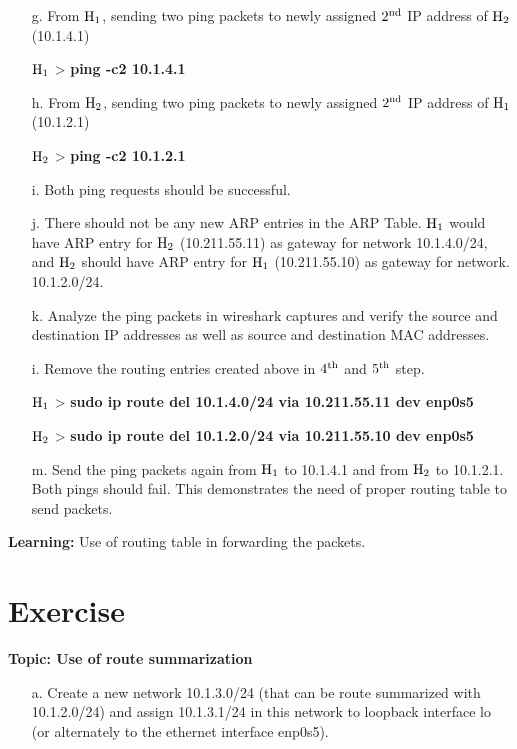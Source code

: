 \begin{multicols}{2}
\begin{itemize}
\item[g.] From ${\rm H}_{1}$, sending two ping packets to newly assigned $2^{\rm nd}$ IP address of ${\rm H}_{2}$ (10.1.4.1)

${\rm H}_{1}$ > \textbf{ping -c2 10.1.4.1}


\item[h.] From ${\rm H}_{2}$, sending two ping packets to newly assigned $2^{\rm nd}$ IP address of ${\rm H}_{1}$ (10.1.2.1)

${\rm H}_{2}$ > \textbf{ping -c2 10.1.2.1}

\item[i.] Both ping requests should be successful.

\item[j.] There should not be any new ARP entries in the ARP Table. ${\rm H}_{1}$ would have ARP entry for ${\rm H}_{2}$ (10.211.55.11) as gateway for network 10.1.4.0/24, and ${\rm H}_{2}$ should have ARP entry for ${\rm H}_{1}$ (10.211.55.10) as gateway for network. 10.1.2.0/24.


\item[k.] Analyze the ping packets in wireshark captures and verify the source and destination IP addresses as well as source and destination MAC addresses.

\item[i.] Remove the routing entries created above in $4^{\rm th}$ and $5^{\rm th}$ step.

${\rm H}_{1}$ > \textbf{sudo ip route del 10.1.4.0/24 via 10.211.55.11 dev enp0s5}

${\rm H}_{2}$ > \textbf{sudo ip route del 10.1.2.0/24 via 10.211.55.10 dev enp0s5}

\item[m.] Send the ping packets again from ${\rm H}_{1}$ to 10.1.4.1 and from ${\rm H}_{2}$ to 10.1.2.1. Both pings should fail. This demonstrates the need of proper routing table to send packets.

\end{itemize}

\textbf{Learning:} Use of routing table in forwarding the packets.

\section*{Exercise \label{chap2-exe3}}

\textbf{Topic: Use of route summarization}

\begin{itemize}
\item[a.] Create a new network 10.1.3.0/24 (that can be route summarized with 10.1.2.0/24) and assign 10.1.3.1/24 in this network to loopback interface lo (or alternately to the ethernet interface enp0s5).


\end{itemize}
\end{multicols}
